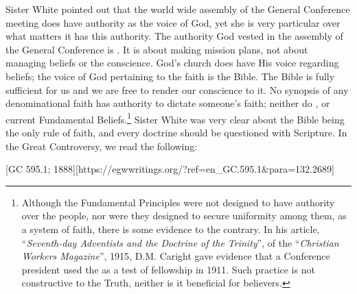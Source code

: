 Sister White pointed out that the world wide assembly of the General Conference meeting does have authority as the voice of God, yet she is very particular over what matters it has this authority. The authority God vested in the assembly of the General Conference is . It is about making mission plans, not about managing beliefs or the conscience. God’s church does have His voice regarding beliefs; the voice of God pertaining to the faith is the Bible. The Bible is fully sufficient for us and we are free to render our conscience to it. No synopsis of any denominational faith has authority to dictate someone's faith; neither do , or current Fundamental Beliefs.\footnote{Although the Fundamental Principles were not designed to have authority over the people, nor were they designed to secure uniformity among them, as a system of faith, there is some evidence to the contrary. In his article, “\textit{Seventh-day Adventists and the Doctrine of the Trinity}”, of the “\textit{Christian Workers Magazine}”, 1915, D.M. Caright gave evidence that a Conference president used the  as a test of fellowship in 1911. Such practice is not constructive to the Truth, neither is it beneficial for believers.} Sister White was very clear about the Bible being the only rule of faith, and every doctrine should be questioned with Scripture. In the Great Controversy, we read the following:

[GC 595.1; 1888][https://egwwritings.org/?ref=en\_GC.595.1&para=132.2689]

